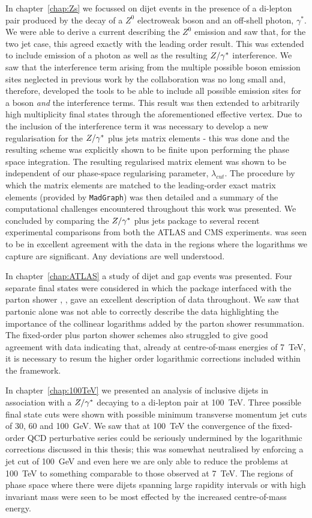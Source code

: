 In chapter~\ref{chap:Zs} we focussed on dijet events in the presence of a di-lepton pair produced by
the decay of a $Z^0$ electroweak boson and an off-shell photon, $\gamma^*$.  We were able to derive a
current describing the $Z^0$ emission and saw that, for the two jet case, this agreed exactly with the
leading order result.  This was extended to include emission of a photon as well as the resulting $Z/\gamma^*$ interference.
We saw that the interference term arising from the multiple possible boson emission sites neglected in previous work by the \hej collaboration was no long small
and, therefore, developed the tools to be able to include all possible emission sites for a boson \emph{and}
the interference terms.  This result was then extended to arbitrarily high multiplicity final states through
the aforementioned effective vertex.  Due to the inclusion of the interference term it was necessary
to develop a new regularisation for the $Z/\gamma^*$ plus jets matrix elements - this was done and the resulting
scheme was explicitly shown to be finite upon performing the phase space integration.  The resulting
regularised matrix element was shown to be independent of our phase-space regularising
parameter, $\lambda_{cut}$.  The procedure by which the \HEJ matrix elements are matched to the leading-order
exact matrix elements (provided by \texttt{MadGraph}) was then detailed and a summary of the computational
challenges encountered throughout this work was presented.  We concluded by comparing the \HEJ $Z/\gamma^*$ plus jets
package to several recent experimental comparisons from both the ATLAS and CMS experiments.  \HEJ was seen to
be in excellent agreement with the data in the regions where the logarithms we capture are significant.
Any deviations are well understood.

In chapter~\ref{chap:ATLAS} a study of dijet and gap events was presented.  Four separate final states
were considered in which the \HEJ package interfaced with the parton shower \ARIADNE, \HEJA, gave an
excellent description of data throughout.  We saw that partonic \HEJ alone was not able to correctly
describe the data highlighting the importance of the collinear logarithms added by the parton shower
resummation.  The fixed-order plus parton shower schemes also struggled to give good agreement with
data indicating that, already at centre-of-mass energies of 7~TeV, it is necessary to resum the higher
order logarithmic corrections included within the \hej framework.

In chapter~\ref{chap:100TeV} we presented an analysis of inclusive dijets in association with a $Z/\gamma^*$
decaying to a di-lepton pair at 100~TeV.  Three possible final state cuts were shown with possible
minimum transverse momentum jet cuts of 30, 60 and 100~GeV.  We saw that at 100~TeV the
convergence of the fixed-order QCD perturbative series could be seriously undermined by the logarithmic
corrections discussed in this thesis; this was somewhat neutralised by enforcing a jet cut of
100~GeV and even here we are only able to reduce the problems at 100~TeV to something comparable
to those observed at 7~TeV.  The regions of phase space where there were dijets spanning
large rapidity intervals or with high invariant mass were seen to be most effected by the increased
centre-of-mass energy.

